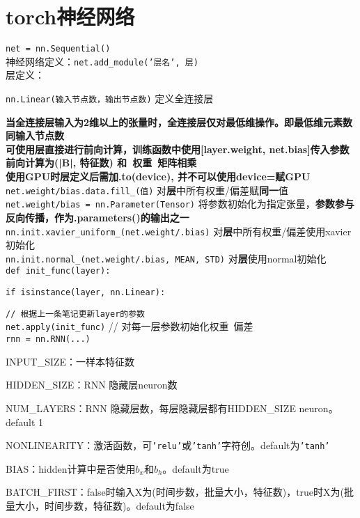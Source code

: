 \documentclass[UTF8]{ctexart}
\begin{document}
\section{torch神经网络}
\noindent \texttt{net = nn.Sequential()}\\
神经网络定义：\texttt{net.add\_module('层名', 层)}\\
层定义：

  \texttt{nn.Linear(输入节点数，输出节点数)} 定义全连接层
  
  \quad \textbf{当全连接层输入为2维以上的张量时，全连接层仅对最低维操作。即最低维元素数同输入节点数}\\
\textbf{可使用层直接进行前向计算，训练函数中使用[layer.weight, net.bias]传入参数}\\
\textbf{前向计算为(|B|, 特征数) 和\ 权重\ 矩阵相乘}\\
\textbf{使用GPU时层定义后需加.to(device), 并不可以使用device=赋GPU}\\
\texttt{net.weight/bias.data.fill\_(值)} 对\textbf{层}中所有权重/偏差赋\textbf{同一}值\\
\texttt{net.weight/bias = nn.Parameter(Tensor)} 将参数初始化为指定张量，\textbf{参数参与反向传播，作为.parameters()的输出之一}\\
\texttt{nn.init.xavier\_uniform\_(net.weight/.bias)} 对\textbf{层}中所有权重/偏差使用xavier初始化\\
\texttt{nn.init.normal\_(net.weight/.bias, MEAN, STD)} 对\textbf{层}使用normal初始化\\
\texttt{def init\_func(layer):}

  \texttt{if isinstance(layer, nn.Linear):}

  \quad \texttt{// 根据上一条笔记更新layer的参数}\\
\texttt{net.apply(init\_func)} // 对每一层参数初始化权重\ 偏差\\
\texttt{rnn = nn.RNN(...)}
  
  INPUT\_SIZE：一样本特征数
  
  HIDDEN\_SIZE：RNN 隐藏层neuron数
  
  NUM\_LAYERS：RNN 隐藏层数，每层隐藏层都有HIDDEN\_SIZE neuron。default 1
  
  NONLINEARITY：激活函数，可\texttt{'relu'}或\texttt{'tanh'}字符创。default为\texttt{'tanh'}

  BIAS：hidden计算中是否使用$b_x$和$b_h$。default为true

  BATCH\_FIRST：false时输入X为(时间步数，批量大小，特征数)，true时X为(批量大小，时间步数，特征数)。default为false
\end{document}
